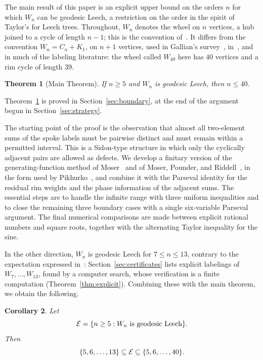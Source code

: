 \documentclass[11pt]{article}
\newtheorem{theorem}{Theorem}[section]
\newtheorem{corollary}[theorem]{Corollary}
\theoremstyle{definition}
\theoremstyle{remark}
\numberwithin{equation}{section}
\newcommand{\calE}{\mathcal{E}}
\DeclarePairedDelimiter{\set}{\{}{\}}
\begin{document}
The main result of this paper is an explicit upper bound on the orders $n$ for
which $W_n$ can be geodesic Leech, a restriction on the order in the spirit of
Taylor's for Leech trees.
Throughout, $W_n$ denotes the wheel on $n$ vertices, a hub joined to a cycle of
length $n-1$; this is the convention of~\cite{LakshmananManattu2025}. It differs
from the convention $W_n=C_n+K_1$, on $n+1$ vertices, used in Gallian's
survey~\cite{Gallian}, in~\cite{LakshmananEldho2024}, and in much of the
labeling literature: the wheel called
$W_{40}$ here has $40$ vertices and a rim cycle of length $39$.

\begin{theorem}[Main Theorem]\label{thm:main}
If $n\ge5$ and $W_n$ is geodesic Leech, then $n\le40$.
\end{theorem}

\noindent
Theorem~\ref{thm:main} is proved in Section~\ref{sec:boundary}, at the end of the
argument begun in Section~\ref{sec:strategy}.

The starting point of the proof is the observation that almost all two-element sums of the spoke labels must be pairwise distinct and must remain within a permitted interval. This is a Sidon-type structure in which only the cyclically adjacent pairs are allowed as defects. We develop a finitary version of the generating-function method of Moser~\cite{Moser1960} and of Moser, Pounder, and Riddell~\cite[Lemma~1]{MoserPounderRiddell1969}, in the form used by Pikhurko~\cite[\S4]{Pikhurko2006}, and combine it with the Parseval identity for the residual rim weights and the phase information of the adjacent sums. The essential steps are to handle the infinite range with three uniform inequalities and to close the remaining three boundary cases with a single six-variable Parseval argument. The final numerical comparisons are made between explicit rational numbers and square roots, together with the alternating Taylor inequality for the sine.

In the other direction, $W_n$ is geodesic Leech for $7\le n\le13$, contrary to the expectation expressed in~\cite{LakshmananManattu2025}: Section~\ref{sec:certificates} lists explicit labelings of $W_7,\ldots,W_{13}$, found by a computer search, whose verification is a finite computation (Theorem~\ref{thm:explicit}). Combining these with the main theorem, we obtain the following.

\begin{corollary}\label{cor:range}
Let
\[
  \calE=\set{n\ge5:W_n\text{ is geodesic Leech}}.
\]
Then
\[
  \set{5,6,\ldots,13}\subseteq\calE
  \subseteq\set{5,6,\ldots,40}.
\]
\end{corollary}
\end{document}
